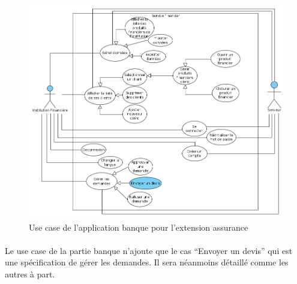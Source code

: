 \documentclass[]{article}
\begin{document}
    \begin{figure}[ht]
        \centering
        \includegraphics[scale=0.3]{img/UseCaseBanque.png}
        \caption{Use case de l'application banque pour l'extension assurance}
        \label{fig1}
        \end{figure}

    \paragraph{}Le use case de la partie banque n’ajoute que le cas “Envoyer un devis” qui est une spécification de gérer les demandes. Il sera néanmoins détaillé comme les autres à part.
\end{document}
